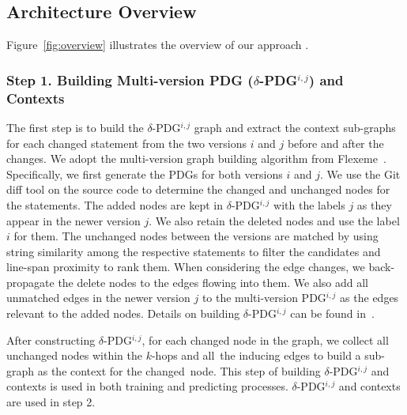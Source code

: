 \subsection{Architecture Overview}
\label{arch-overview:sec}


Figure~\ref{fig:overview} illustrates the overview of our approach {\tool}.

\subsubsection{{\bf Step 1. Building Multi-version PDG ($\delta$-PDG$^{i,j}$) and Contexts}}
The first step is to build the $\delta$-PDG$^{i,j}$ graph and extract
the context sub-graphs for each changed statement from the two
versions $i$ and $j$ before and after the changes. We adopt the
multi-version graph building algorithm from
Flexeme~\cite{flexeme-fse20}. Specifically, we first generate the PDGs
for both versions $i$ and $j$. We use the Git diff tool on the source
code to determine the changed and unchanged nodes for the
statements. The added nodes are kept in $\delta$-PDG$^{i,j}$ with the
labels $j$ as they appear in the newer version $j$. We also retain the
deleted nodes and use the label $i$ for them. The unchanged nodes
between the versions are matched by using string similarity among the
respective statements to filter the candidates and line-span proximity
to rank them. When considering the edge changes, we back-propagate the
delete nodes to the edges flowing into them. We also add all unmatched
edges in the newer version $j$ to the multi-version PDG$^{i,j}$ as the
edges relevant to the added nodes. Details on building
$\delta$-PDG$^{i,j}$ can be found in~\cite{flexeme-fse20}.

After constructing $\delta$-PDG$^{i,j}$, for each changed node in the
graph, we collect all unchanged nodes within the $k$-hops and
all~the inducing edges to build a sub-graph as the context for the
changed~node. 
This step of building $\delta$-PDG$^{i,j}$ and contexts is used in
both training and predicting processes. $\delta$-PDG$^{i,j}$ and contexts are used in step
2.

